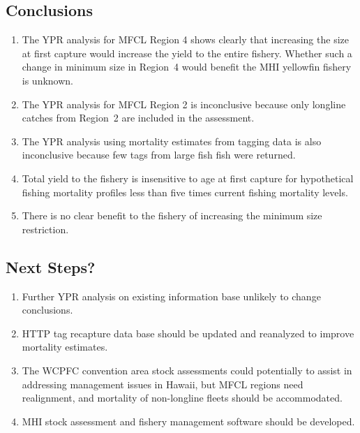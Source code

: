 \documentclass[a4paper,KOMA,landscape,titlepage]{powersem}
\begin{document}
\begin{slide}\section{Conclusions}
\begin{enumerate}
\item The YPR analysis for MFCL Region 4 shows clearly that increasing
the size at first capture would increase the yield to the entire fishery.
Whether such a change in minimum size in Region~4 would
benefit the MHI yellowfin fishery is unknown.

\item The YPR analysis for MFCL Region 2 is inconclusive because only
longline catches from Region~2 are included in the assessment.

\item The YPR analysis using mortality estimates from tagging data is
also inconclusive because few tags from large fish fish were returned.

\item Total yield to the fishery is insensitive to age at first
capture for hypothetical fishing mortality profiles less than five
times current fishing mortality levels.

\item There is no clear benefit to the fishery of increasing the
minimum size restriction.
\end{enumerate}
\end{slide}

\begin{slide}\section{Next Steps?}
\begin{enumerate}
\item Further YPR analysis on existing information base unlikely to
change conclusions.

\item HTTP tag recapture data base should be updated and reanalyzed to
improve mortality estimates.

\item The WCPFC convention area stock assessments could potentially
to assist in addressing management issues in Hawaii, but 
MFCL regions need realignment, and mortality of non-longline fleets
should be accommodated.

\item MHI stock assessment and fishery management software should be
developed.

\end{enumerate}
\end{slide}
\end{document}
